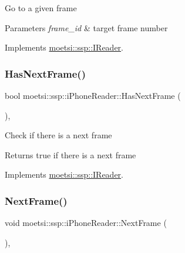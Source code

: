 Go to a given frame 
\begin{DoxyParams}{Parameters}
{\em frame\+\_\+id} & target frame number \\
\hline
\end{DoxyParams}


Implements \hyperlink{classmoetsi_1_1ssp_1_1IReader_a6f1be3c06538992cca6d550bd9566681}{moetsi\+::ssp\+::\+I\+Reader}.

\mbox{\label{classmoetsi_1_1ssp_1_1iPhoneReader_a35ca55a03a9fb7b559f9381b11f53bfe}} 
\subsubsection{\texorpdfstring{Has\+Next\+Frame()}{HasNextFrame()}}
{\footnotesize\ttfamily bool moetsi\+::ssp\+::i\+Phone\+Reader\+::\+Has\+Next\+Frame (\begin{DoxyParamCaption}{ }\end{DoxyParamCaption})\hspace{0.3cm}{\ttfamily [override]}, {\ttfamily [virtual]}}

Check if there is a next frame \begin{DoxyReturn}{Returns}
true if there is a next frame 
\end{DoxyReturn}


Implements \hyperlink{classmoetsi_1_1ssp_1_1IReader_af9186ba41e136dc4ec3242b5dd55fa04}{moetsi\+::ssp\+::\+I\+Reader}.

\mbox{\label{classmoetsi_1_1ssp_1_1iPhoneReader_abba4479843de3e7ab42a3116b9fa94c9}} 
\subsubsection{\texorpdfstring{Next\+Frame()}{NextFrame()}}
{\footnotesize\ttfamily void moetsi\+::ssp\+::i\+Phone\+Reader\+::\+Next\+Frame (\begin{DoxyParamCaption}{ }\end{DoxyParamCaption})\hspace{0.3cm}{\ttfamily [override]}, {\ttfamily [virtual]}}

